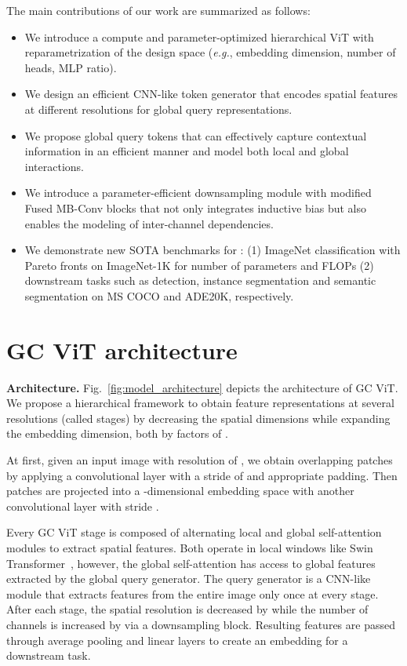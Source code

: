 \documentclass{article}
\theoremstyle{plain}
\theoremstyle{definition}
\theoremstyle{remark}
\begin{document}
The main contributions of our work are summarized as follows:


\begin{itemize}[leftmargin=*,nosep]
\item We introduce a compute and parameter-optimized hierarchical ViT with reparametrization of the design space (\textit{e.g.}, embedding dimension, number of heads, MLP ratio).
\item We design an efficient CNN-like token generator that encodes spatial features at different resolutions for global query representations.

\item We propose global query tokens that can effectively capture contextual information in an efficient manner and model both local and global interactions.
\item We introduce a parameter-efficient downsampling module with modified Fused MB-Conv blocks that not only integrates inductive bias but also enables the modeling of inter-channel dependencies.

\item We demonstrate new SOTA benchmarks for : (1) ImageNet classification with Pareto fronts on ImageNet-1K for number of parameters and FLOPs (2) downstream tasks such as detection, instance segmentation and semantic segmentation on MS COCO and ADE20K, respectively.
\end{itemize} \section{GC ViT architecture}


\label{sec:arch}
\textbf{Architecture.} Fig.~\ref{fig:model_architecture} depicts the architecture of GC ViT. We propose a hierarchical framework to obtain feature representations at several resolutions (called stages) by decreasing the spatial dimensions while expanding the embedding dimension, both by factors of . 

At first, given an input image with resolution of , we obtain overlapping patches by applying a  convolutional layer with a stride of  and appropriate padding. Then patches are projected into a -dimensional embedding space with another  convolutional layer with stride . 

Every GC ViT stage is composed of alternating local and global self-attention modules to extract spatial features. Both operate in local windows like Swin Transformer~\citep{liu2021swin}, however, the global self-attention has access to global features extracted by the global query generator. The query generator is a CNN-like module that extracts features from the entire image only once at every stage. After each stage, the spatial resolution is decreased by  while the number of channels is increased by  via a downsampling block. Resulting features are passed through average pooling and linear layers to create an embedding for a downstream task. 
\end{document}
